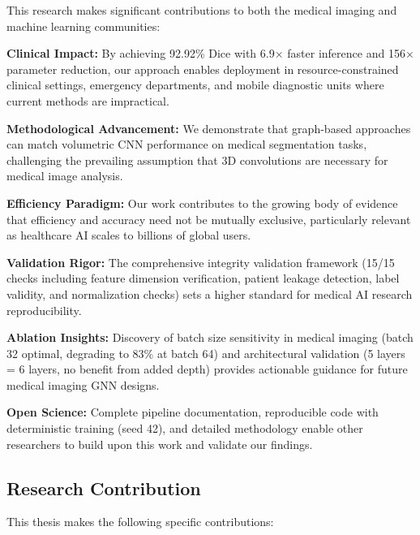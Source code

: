 This research makes significant contributions to both the medical imaging and machine learning communities:

\textbf{Clinical Impact:} By achieving 92.92\% Dice with 6.9$\times$ faster inference and 156$\times$ parameter reduction, our approach enables deployment in resource-constrained clinical settings, emergency departments, and mobile diagnostic units where current methods are impractical.

\textbf{Methodological Advancement:} We demonstrate that graph-based approaches can match volumetric CNN performance on medical segmentation tasks, challenging the prevailing assumption that 3D convolutions are necessary for medical image analysis.

\textbf{Efficiency Paradigm:} Our work contributes to the growing body of evidence that efficiency and accuracy need not be mutually exclusive, particularly relevant as healthcare AI scales to billions of global users.

\textbf{Validation Rigor:} The comprehensive integrity validation framework (15/15 checks including feature dimension verification, patient leakage detection, label validity, and normalization checks) sets a higher standard for medical AI research reproducibility.

\textbf{Ablation Insights:} Discovery of batch size sensitivity in medical imaging (batch 32 optimal, degrading to 83\% at batch 64) and architectural validation (5 layers = 6 layers, no benefit from added depth) provides actionable guidance for future medical imaging GNN designs.

\textbf{Open Science:} Complete pipeline documentation, reproducible code with deterministic training (seed 42), and detailed methodology enable other researchers to build upon this work and validate our findings.

\subsection{Research Contribution}

This thesis makes the following specific contributions:

